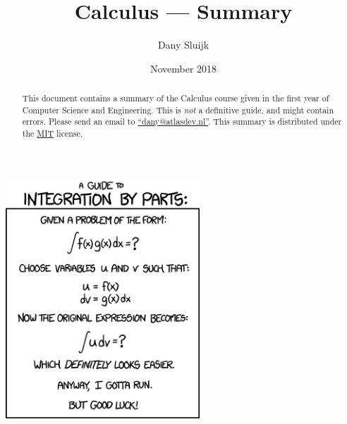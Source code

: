 \documentclass[a4paper,12pt]{article}
\title{Calculus --- Summary}
\author{Dany Sluijk}
\date{November 2018}
\begin{document}
\maketitle
\begin{center}
	\includegraphics[height=9cm]{./intro}
\end{center}
\begin{abstract}
	This document contains a summary of the Calculus course given
	in the first year of Computer Science and Engineering.
	This is \emph{not} a definitive guide, and might contain errors.
	Please send an email to \href{mailto:dany@atlasdev.nl}{``dany@atlasdev.nl''}.
	This summary is distributed under the
	\href{https://opensource.org/licenses/MIT}{MIT} license.
\end{abstract}

\newpage
\tableofcontents



\end{document}
